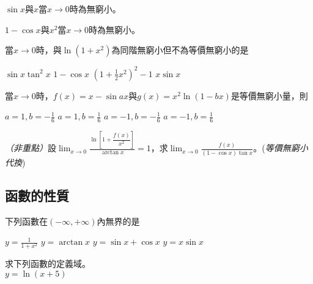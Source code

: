 \documentclass[12pt, addpoints]{exam}
\def \unimportant{\textit{（非重點）}}
\def \hint#1{(\textit{#1})}
\begin{document}
\begin{questions}
\question[1]
$\sin{x}$與$x$當$x \to 0$時為\fillin[Black]無窮小。

\question[1]
$1-\cos{x}$與$x^2$當$x \to 0$時為\fillin[Black]無窮小。

\newpage %

\question[1]
當$x \to 0$時，與$\ln{(1+x^2)}$為同階無窮小但不為等價無窮小的是
\begin{choices}
    \choice $\sin{x}\tan^2{x}$
    \choice $1-\cos{x}$
    \choice $\displaystyle \left( 1+\frac{1}{2}x^2 \right)^2-1$
    \choice $x \sin{x}$
\end{choices}

\question[1]
當$x \to 0$時，$f(x)=x-\sin ax$與$g(x)=x^2 \ln (1-bx)$是等價無窮小量，則
\begin{choices}
    \choice $\displaystyle a=1, b=-\frac{1}{6}$
    \choice $\displaystyle a=1, b=\frac{1}{6}$
    \choice $\displaystyle a=-1, b=-\frac{1}{6}$
    \choice $\displaystyle a=-1, b=\frac{1}{6}$
\end{choices}

\bonusquestion
\unimportant 設$\displaystyle \lim_{x \to 0} \frac{\ln{\left[ 1+\dfrac{f(x)}{x^2} \right]}}{\arctan{x}}=1$，求$\displaystyle \lim_{x \to 0} \frac{f(x)}{(1-\cos{x})\tan{x}}$。\hint{等價無窮小代換}

\end{questions}

\newpage %

\subsection{函數的性質}

\begin{questions}

\question[1]
下列函數在$(-\infty,+\infty)$內無界的是
\begin{choices}
    \choice $\displaystyle y=\frac{1}{1+x^2}$
    \choice $\displaystyle y=\arctan{x}$
    \choice $\displaystyle y=\sin{x}+\cos{x}$
    \choice $\displaystyle y=x \sin{x}$
\end{choices}

\question[1]
求下列函數的定義域。\\
$y=\ln{(x+5)}$

\end{questions}
\end{document}
